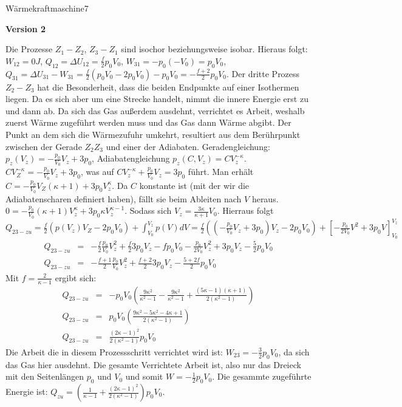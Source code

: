 \begin{problem}{Wärmekraftmaschine}{7}
\begin{solution}
\textbf{Version 2}

Die Prozesse $Z_1 - Z_2$, $Z_3 - Z_1$ sind isochor beziehungsweise isobar. Hieraus folgt: $W_{12}=0J$, $Q_{12}=\Delta U_{12}=\frac f2 p_0V_0$, $W_{31}=-p_0(-V_0)=p_0V_0$, $Q_{31}=\Delta U_{31}-W_{31}=\frac f2 (p_0V_0-2p_0V_0)-p_0V_0=-\frac{f+2}2p_0V_0$. Der dritte Prozess $Z_2-Z_3$ hat die Besonderheit, dass die beiden Endpunkte auf einer Isothermen liegen. Da es sich aber um eine Strecke handelt, nimmt die innere Energie erst zu und dann ab. Da sich das Gas außerdem ausdehnt, verrichtet es Arbeit, weshalb zuerst Wärme zugeführt werden muss und das Gas dann Wärme abgibt. Der Punkt an dem sich die Wärmezufuhr umkehrt, resultiert aus dem Berührpunkt zwischen der Gerade $Z_2Z_3$ und einer der Adiabaten. Geradengleichung: $p_z(V_z)=-\frac{p_0}{V_0}V_z+3p_0$, Adiabatengleichung $p_z(C,V_z)=CV_z^{-\kappa}$. $CV_Z^{-\kappa}=-\frac{p_0}{V_0}V_z+3p_0$, was auf $CV_{z}^{-\kappa}+\frac{p_0}{V_0}V_z=3p_0$ führt. Man erhält $C=-\frac{p_0}{V_0}V_Z(\kappa+1)+3p_0V_z^{\kappa}$. Da $C$ konstante ist (mit der wir die Adiabatenscharen definiert haben), fällt sie beim Ableiten nach $V$ heraus. $0=-\frac{p_0}{V_0}(\kappa+1)V_z^{\kappa}+3p_0\kappa V_z^{\kappa -1}$. Sodass sich $V_z=\frac{3\kappa}{\kappa+1}V_0$. Hierraus folgt $Q_{23-zu}=\frac f2 (p(V_z)V_Z-2p_0V_0)+\int_{V_0}^{V_z}p(V)dV=\frac f2 ((-\frac{p_0}{V_0}V_z+3p_0)V_z-2p_0V_0)+[-\frac{p_0}{2V_0}V^2+3p_0V]_{V_0}^{V_z}$
\begin{eqnarray}
\nonumber Q_{23-zu}&=&-\frac f2\frac{p_0}{V_0}V_z^2+\frac f23p_0V_z-fp_0V_0-\frac{p_0}{2V_0}V_z^2+3p_0V_z-\frac 52p_0V_0\\
\nonumber Q_{23-zu}&=&-\frac{f+1}2\frac{p_0}{V_0}V_z^2+\frac{f+2}23p_0V_z-\frac{5+2f}2p_0V_0
\end{eqnarray}
Mit $f=\frac 2{\kappa-1}$ ergibt sich:
\begin{eqnarray}
\nonumber Q_{23-zu}&=&-p_0V_0\left(\frac{9\kappa^2}{\kappa^2-1}-\frac{9\kappa^2}{\kappa^2-1}+\frac{(5\kappa -1)(\kappa +1)}{2(\kappa^2-1)}\right)\\
\nonumber Q_{23-zu}&=&p_0V_0\left(\frac{9\kappa^2-5\kappa^2-4\kappa+1}{2(\kappa^2-1)}\right)\\
\nonumber Q_{23-zu}&=&\frac{(2\kappa-1)^2}{2(\kappa^2-1)}p_0V_0
\end{eqnarray}
Die Arbeit die in diesem Prozessschritt verrichtet wird ist: $W_{23}=-\frac 32p_0V_0$, da sich das Gas hier ausdehnt. Die gesamte Verrichtete Arbeit ist, also nur das Dreieck mit den Seitenlängen $p_0$ und $V_0$ und somit $W=-\frac 12p_0V_0$. Die gesammte zugeführte Energie ist: $Q_{zu}=(\frac 1{\kappa -1}+\frac{(2\kappa-1)^2}{2(\kappa^2-1)})p_0V_0$.

\end{solution}
\end{problem}
